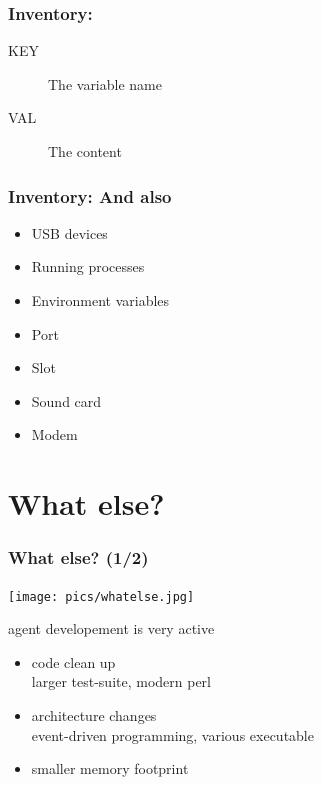 \documentclass{beamer}
\begin{document}
\begin{frame}
\frametitle{Inventory: }
\begin{description}
      \item[KEY] The variable name
      \item[VAL] The content
\end{description}
\end{frame}


\begin{frame}
\frametitle{Inventory: And also}
\begin{itemize}
      \item USB devices
      \item Running processes
      \item Environment variables
      \item Port
      \item Slot
      \item Sound card
      \item Modem
\end{itemize}
\end{frame}


\section{What else?}


\begin{frame}
    \frametitle{What else? (1/2)}

    \begin{center}
    \texttt{[image: pics/whatelse.jpg]}
    \end{center}

    \pause

    \begin{block}{agent developement is very active}
        \begin{itemize}
            \item code clean up\\
            {\small larger test-suite, modern perl}
            \item architecture changes\\
            {\small event-driven programming, various executable}
            \item smaller memory footprint
        \end{itemize}
    \end{block}
\end{frame}
\end{document}
